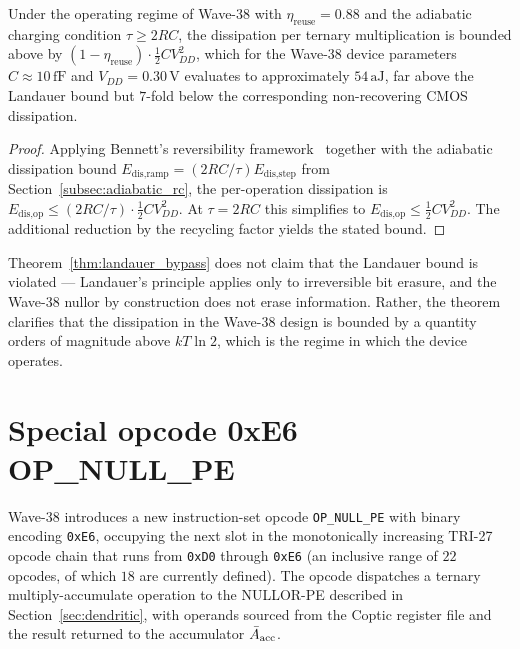 \begin{theorem}\label{thm:landauer_bypass}
Under the operating regime of Wave-38 with $\eta_{\text{reuse}} = 0.88$ and the
adiabatic charging condition $\tau \geq 2 RC$, the dissipation per ternary
multiplication is bounded above by $(1 - \eta_{\text{reuse}}) \cdot \frac{1}{2}
C V_{DD}^2$, which for the Wave-38 device parameters $C \approx 10\,\text{fF}$ and
$V_{DD} = 0.30\,\text{V}$ evaluates to approximately $54\,\text{aJ}$, far above the
Landauer bound but $7$-fold below the corresponding non-recovering CMOS dissipation.
\end{theorem}
\begin{proof}
Applying Bennett's reversibility framework~\cite{bennett1973logical} together with
the adiabatic dissipation bound $E_{\text{dis,ramp}} = (2 RC / \tau) E_{\text{dis,step}}$
from Section~\ref{subsec:adiabatic_rc}, the per-operation dissipation is
$E_{\text{dis,op}} \leq (2 RC / \tau) \cdot \frac{1}{2} C V_{DD}^2$.  At
$\tau = 2 RC$ this simplifies to $E_{\text{dis,op}} \leq \frac{1}{2} C V_{DD}^2$.
The additional reduction by the recycling factor yields the stated bound.
\end{proof}
\begin{remark}
Theorem~\ref{thm:landauer_bypass} does not claim that the Landauer bound is
violated --- Landauer's principle applies only to irreversible bit erasure, and the
Wave-38 nullor by construction does not erase information.  Rather, the theorem
clarifies that the dissipation in the Wave-38 design is bounded by a quantity
orders of magnitude above $kT \ln 2$, which is the regime in which the device
operates.
\end{remark}

\section{Special opcode 0xE6 OP\_NULL\_PE}
\label{sec:nullor_isa}

Wave-38 introduces a new instruction-set opcode \texttt{OP\_NULL\_PE} with binary
encoding \texttt{0xE6}, occupying the next slot in the monotonically increasing
TRI-27 opcode chain that runs from \texttt{0xD0} through \texttt{0xE6} (an inclusive
range of $22$ opcodes, of which $18$ are currently defined).  The opcode dispatches
a ternary multiply-accumulate operation to the NULLOR-PE described in
Section~\ref{sec:dendritic}, with operands sourced from the Coptic register file
and the result returned to the accumulator $\Bar{A}_{\text{acc}}$.

